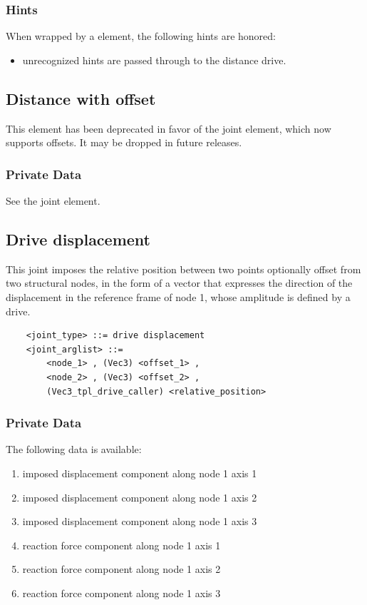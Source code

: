 \subsubsection{Hints}
When wrapped by a  element, the following hints are honored:
\begin{itemize}
\item unrecognized hints are passed through to the distance drive.
\end{itemize}



\subsection{Distance with offset}
This element has been deprecated in favor of the 
joint element, which now supports offsets.
It may be dropped in future releases.

\subsubsection{Private Data}
See the  joint element.



\subsection{Drive displacement}
\label{sec:EL:JOINT:DRIVEDISPLACEMENT}
This joint imposes the relative position between two points 
optionally offset from two structural nodes,
in the form of a vector that expresses the direction of the displacement
in the reference frame of node 1, whose amplitude is defined by a drive.
\begin{verbatim}
    <joint_type> ::= drive displacement
    <joint_arglist> ::= 
        <node_1> , (Vec3) <offset_1> ,
        <node_2> , (Vec3) <offset_2> ,
        (Vec3_tpl_drive_caller) <relative_position>
\end{verbatim}

\subsubsection{Private Data}
The following data is available:
\begin{enumerate}
\item {} imposed displacement component along node 1 axis 1
\item {} imposed displacement component along node 1 axis 2
\item {} imposed displacement component along node 1 axis 3
\item {} reaction force component along node 1 axis 1
\item {} reaction force component along node 1 axis 2
\item {} reaction force component along node 1 axis 3
\end{enumerate}

